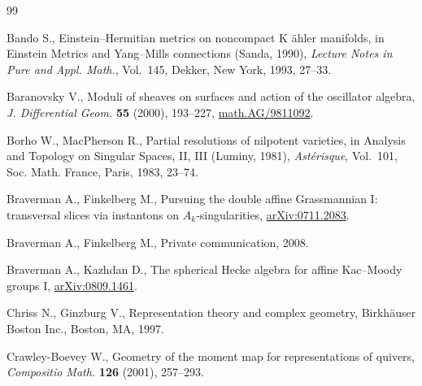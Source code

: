 \begin{thebibliography}{99}


\footnotesize\itemsep=0pt

Bando S.,  Einstein--Hermitian metrics on noncompact  K \"ahler
  manifolds, in Einstein Metrics and Yang--Mills connections (Sanda, 1990),
 {\it  Lecture Notes in Pure and Appl. Math.}, Vol.~145, Dekker, New York, 1993,
27--33. %

Baranovsky V.,  Moduli of sheaves on surfaces and action of the oscillator
  algebra, {\it J. Differential Geom.} \textbf{55} (2000),  193--227, \href{http://arxiv.org/abs/math.AG/9811092}{math.AG/9811092}.

Borho W., MacPherson R.,  Partial resolutions of nilpotent varieties,
  in Analysis and Topology on Singular Spaces, II, III (Luminy, 1981),
 {\it  Ast\'erisque}, Vol.~101, Soc. Math. France, Paris, 1983,  23--74.

Braverman A., Finkelberg M.,  Pursuing the double af\/f\/ine {G}rassmannian
  {I}: transversal slices via instantons on ${A}_k$-singularities, \href{http://arxiv.org/abs/0711.2083}{arXiv:0711.2083}.

Braverman A., Finkelberg M., Private communication, 2008.

Braverman A., Kazhdan D., The spherical {H}ecke algebra for af\/f\/ine
  {K}ac--{M}oody groups {I}, \href{http://arxiv.org/abs/0809.1461}{arXiv:0809.1461}.

Chriss N., Ginzburg V.,  Representation theory and complex geometry,
  Birkh\"auser Boston Inc., Boston, MA, 1997. %

Crawley-Boevey W., Geometry of the moment map for representations of
  quivers, {\it Compositio Math.} \textbf{126} (2001),   257--293.


\end{thebibliography}
